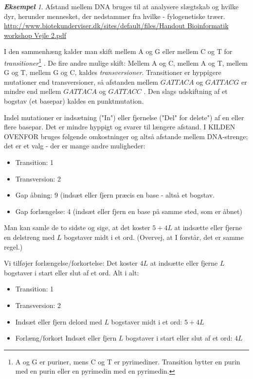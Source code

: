 \documentclass[a4paper, 12pt]{article}
\theoremstyle{remark}
\newtheorem{Eksempel}{\textbf{Eksempel}}
\begin{document}
\begin{Eksempel}
Afstand mellem DNA bruges til at analysere slægtskab og hvilke dyr, herunder mennesket, der nedstammer fra hvilke - fylogenetiske træer.\\ \url{ http://www.biotekunderviser.dk/sites/default/files/Handout Bioinformatik workshop Vejle 2.pdf}

I den sammenhæng kalder man skift mellem A og G eller mellem C og T for \emph{transitioner}\footnote{A og G er puriner, mens C og T er pyrimediner. Transition bytter en purin med en purin eller en pyrimedin med en pyrimedin.} . De fire andre mulige skift: Mellem A og C, mellem A og T, mellem G og T, mellem G og C, kaldes \emph{transversioner}. Transitioner er hyppigere mutationer end transversioner, så afstanden mellem $GATTACA$ og $GATTACG$ er mindre end mellem $GATTACA$ og $GATTACC$ . Den slags udskiftning af et bogstav (et basepar) kaldes en punktmutation.

Indel mutationer er indsætning ("In") eller fjernelse ("Del" for delete") af en eller flere basepar. Det er mindre hyppigt og svarer til længere afstand. I  KILDEN OVENFOR bruges følgende omkostninger og altså afstande mellem DNA-strenge; det er et valg - der er mange andre muligheder: 
\begin{itemize}
\item Transition: 1
\item Transversion: 2
\item Gap åbning: 9 (indsæt eller fjern præcis en base - altså et bogstav.
\item Gap forlængelse: 4 (indsæt eller fjern en base på samme sted, som er åbnet)
\end{itemize}
Man kan samle de to sidste og sige, at det koster $5+4L$ at indsætte eller fjerne en delstreng med $L$ bogstaver midt i et ord. (Overvej, at I forstår, det er samme regel.)

Vi tilføjer forlængelse/forkortelse: Det koster $4L$ at indsætte eller fjerne $L$ bogstaver i start eller slut af et ord. Alt i alt:
\begin{itemize}
\item Transition: 1
\item Transversion: 2
\item Indsæt eller fjern delord med $L$ bogstaver midt i et ord: $5+4L$
\item Forlæng/forkort Indsæt eller fjern $L$ bogstaver i start eller slut af et ord: $4L$
\end{itemize}
\end{Eksempel}
\end{document}
